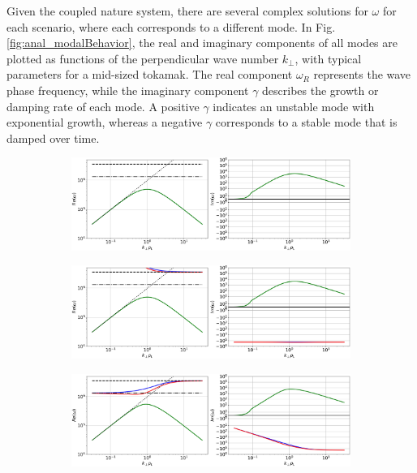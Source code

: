 Given the coupled nature system, there are several complex solutions for $\omega$ for each scenario, where each corresponds to a different mode. In Fig. \ref{fig:anal_modalBehavior}, the real and imaginary components of all modes are plotted as functions of the perpendicular wave number $k_\perp$, with typical parameters for a mid-sized tokamak. The real component $\omega_R$ represents the wave phase frequency, while the imaginary component $\gamma$ describes the growth or damping rate of each mode. A positive $\gamma$ indicates an unstable mode with exponential growth, whereas a negative $\gamma$ corresponds to a stable mode that is damped over time.

\begin{figure}[H]
	\centering
	\begin{subfigure}[t]{0.85\textwidth}
		\centering
		\includegraphics[width=1\textwidth]{schemes/modes_ES.jpg}
		\label{fig:anal_modesES}
	\end{subfigure}
\end{figure}
\begin{figure}[H]
	\ContinuedFloat
	\centering
	\begin{subfigure}[t]{0.85\textwidth}
		\centering
		\includegraphics[width=1\textwidth]{schemes/modes_ES-inert.jpg}
		\label{fig:anal_modesEI}
	\end{subfigure}
\end{figure}
\begin{figure}[H]
	\ContinuedFloat
	\centering
	\begin{subfigure}[t]{0.85\textwidth}
		\centering
		\includegraphics[width=1\textwidth]{schemes/modes_EM.jpg}
		\label{fig:anal_modesEM}
	\end{subfigure}
\end{figure}
